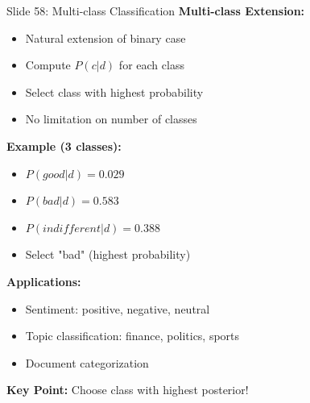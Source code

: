 \documentclass[8pt]{beamer}
\begin{document}
	\begin{frame}{Slide 58: Multi-class Classification}
		\fontsize{6.5}{7.5}\selectfont
		\textbf{Multi-class Extension:}
		\begin{itemize}
			\item Natural extension of binary case
			\item Compute $P(c|d)$ for each class
			\item Select class with highest probability
			\item No limitation on number of classes
		\end{itemize}
		
		\vspace{0.1cm}
		\textbf{Example (3 classes):}
		\begin{itemize}
			\item $P(good|d) = 0.029$
			\item $P(bad|d) = 0.583$
			\item $P(indifferent|d) = 0.388$
			\item Select "bad" (highest probability)
		\end{itemize}
		
		\vspace{0.1cm}
		\textbf{Applications:}
		\begin{itemize}
			\item Sentiment: positive, negative, neutral
			\item Topic classification: finance, politics, sports
			\item Document categorization
		\end{itemize}
		
		\textcolor{myblue}{\textbf{Key Point:}} Choose class with highest posterior!
	\end{frame}
	
\end{document}
